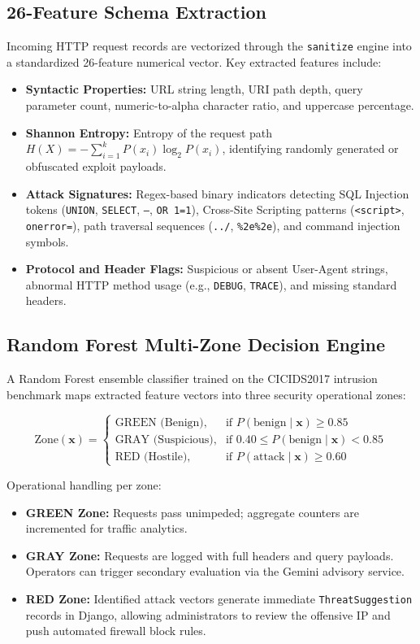 \subsection{26-Feature Schema Extraction}
Incoming HTTP request records are vectorized through the \texttt{sanitize} engine into a standardized 26-feature numerical vector. Key extracted features include:
\begin{itemize}
  \item \textbf{Syntactic Properties:} URL string length, URI path depth, query parameter count, numeric-to-alpha character ratio, and uppercase percentage.
  \item \textbf{Shannon Entropy:} Entropy of the request path $H(X) = -\sum_{i=1}^k P(x_i) \log_2 P(x_i)$, identifying randomly generated or obfuscated exploit payloads.
  \item \textbf{Attack Signatures:} Regex-based binary indicators detecting SQL Injection tokens (\texttt{UNION}, \texttt{SELECT}, \texttt{--}, \texttt{OR 1=1}), Cross-Site Scripting patterns (\texttt{<script>}, \texttt{onerror=}), path traversal sequences (\texttt{../}, \texttt{\%2e\%2e}), and command injection symbols.
  \item \textbf{Protocol and Header Flags:} Suspicious or absent User-Agent strings, abnormal HTTP method usage (e.g., \texttt{DEBUG}, \texttt{TRACE}), and missing standard headers.
\end{itemize}

\subsection{Random Forest Multi-Zone Decision Engine}
A Random Forest ensemble classifier trained on the CICIDS2017 intrusion benchmark maps extracted feature vectors into three security operational zones:

\begin{equation}
  \text{Zone}(\mathbf{x}) = \begin{cases}
    \text{GREEN (Benign)}, & \text{if } P(\text{benign} \mid \mathbf{x}) \geq 0.85 \\
    \text{GRAY (Suspicious)}, & \text{if } 0.40 \leq P(\text{benign} \mid \mathbf{x}) < 0.85 \\
    \text{RED (Hostile)}, & \text{if } P(\text{attack} \mid \mathbf{x}) \geq 0.60
  \end{cases}
\end{equation}

Operational handling per zone:
\begin{itemize}
  \item \textbf{GREEN Zone:} Requests pass unimpeded; aggregate counters are incremented for traffic analytics.
  \item \textbf{GRAY Zone:} Requests are logged with full headers and query payloads. Operators can trigger secondary evaluation via the Gemini advisory service.
  \item \textbf{RED Zone:} Identified attack vectors generate immediate \texttt{ThreatSuggestion} records in Django, allowing administrators to review the offensive IP and push automated firewall block rules.
\end{itemize}

